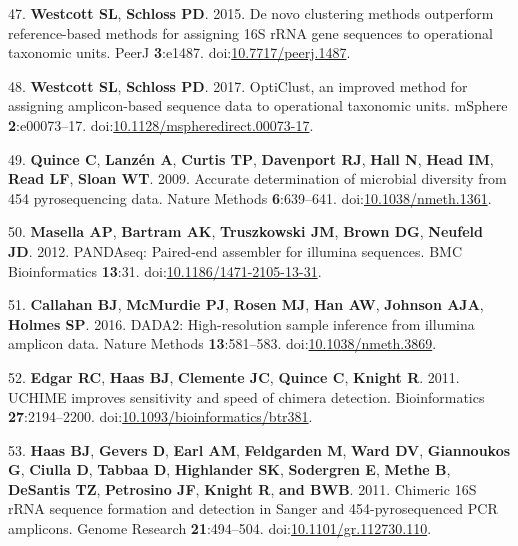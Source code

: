 \documentclass[11pt,]{article}
\begin{document}
\leavevmode\hypertarget{ref-Westcott2015}{}%
47. \textbf{Westcott SL}, \textbf{Schloss PD}. 2015. De novo clustering
methods outperform reference-based methods for assigning 16S rRNA gene
sequences to operational taxonomic units. PeerJ \textbf{3}:e1487.
doi:\href{https://doi.org/10.7717/peerj.1487}{10.7717/peerj.1487}.

\leavevmode\hypertarget{ref-Westcott2017}{}%
48. \textbf{Westcott SL}, \textbf{Schloss PD}. 2017. OptiClust, an
improved method for assigning amplicon-based sequence data to
operational taxonomic units. mSphere \textbf{2}:e00073--17.
doi:\href{https://doi.org/10.1128/mspheredirect.00073-17}{10.1128/mspheredirect.00073-17}.

\leavevmode\hypertarget{ref-Quince2009}{}%
49. \textbf{Quince C}, \textbf{Lanzén A}, \textbf{Curtis TP},
\textbf{Davenport RJ}, \textbf{Hall N}, \textbf{Head IM}, \textbf{Read
LF}, \textbf{Sloan WT}. 2009. Accurate determination of microbial
diversity from 454 pyrosequencing data. Nature Methods
\textbf{6}:639--641.
doi:\href{https://doi.org/10.1038/nmeth.1361}{10.1038/nmeth.1361}.

\leavevmode\hypertarget{ref-Masella2012}{}%
50. \textbf{Masella AP}, \textbf{Bartram AK}, \textbf{Truszkowski JM},
\textbf{Brown DG}, \textbf{Neufeld JD}. 2012. PANDAseq: Paired-end
assembler for illumina sequences. BMC Bioinformatics \textbf{13}:31.
doi:\href{https://doi.org/10.1186/1471-2105-13-31}{10.1186/1471-2105-13-31}.

\leavevmode\hypertarget{ref-Callahan2016}{}%
51. \textbf{Callahan BJ}, \textbf{McMurdie PJ}, \textbf{Rosen MJ},
\textbf{Han AW}, \textbf{Johnson AJA}, \textbf{Holmes SP}. 2016. DADA2:
High-resolution sample inference from illumina amplicon data. Nature
Methods \textbf{13}:581--583.
doi:\href{https://doi.org/10.1038/nmeth.3869}{10.1038/nmeth.3869}.

\leavevmode\hypertarget{ref-Edgar2011}{}%
52. \textbf{Edgar RC}, \textbf{Haas BJ}, \textbf{Clemente JC},
\textbf{Quince C}, \textbf{Knight R}. 2011. UCHIME improves sensitivity
and speed of chimera detection. Bioinformatics \textbf{27}:2194--2200.
doi:\href{https://doi.org/10.1093/bioinformatics/btr381}{10.1093/bioinformatics/btr381}.

\leavevmode\hypertarget{ref-Haas2011}{}%
53. \textbf{Haas BJ}, \textbf{Gevers D}, \textbf{Earl AM},
\textbf{Feldgarden M}, \textbf{Ward DV}, \textbf{Giannoukos G},
\textbf{Ciulla D}, \textbf{Tabbaa D}, \textbf{Highlander SK},
\textbf{Sodergren E}, \textbf{Methe B}, \textbf{DeSantis TZ},
\textbf{Petrosino JF}, \textbf{Knight R}, \textbf{and BWB}. 2011.
Chimeric 16S rRNA sequence formation and detection in Sanger and
454-pyrosequenced PCR amplicons. Genome Research \textbf{21}:494--504.
doi:\href{https://doi.org/10.1101/gr.112730.110}{10.1101/gr.112730.110}.
\end{document}
